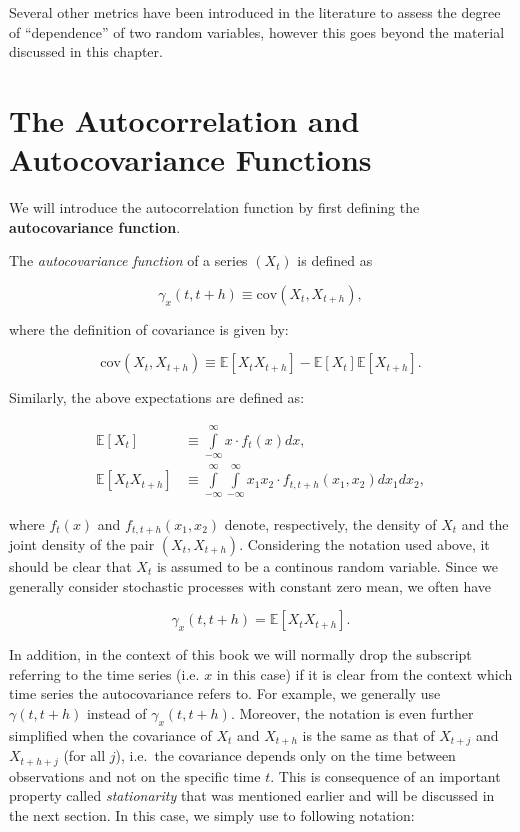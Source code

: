 \documentclass[]{book}
\theoremstyle{definition}
\theoremstyle{definition}
\theoremstyle{definition}
\theoremstyle{remark}
\let\BeginKnitrBlock\begin \let\EndKnitrBlock\end
\begin{document}
Several other metrics have been introduced in the literature to assess
the degree of ``dependence'' of two random variables, however this goes
beyond the material discussed in this chapter.

\hypertarget{the-autocorrelation-and-autocovariance-functions}{%
\section{The Autocorrelation and Autocovariance
Functions}\label{the-autocorrelation-and-autocovariance-functions}}

We will introduce the autocorrelation function by first defining the
\textbf{autocovariance function}.

\BeginKnitrBlock{definition}
\protect\hypertarget{def:acvf}{}{\label{def:acvf} }The \emph{autocovariance
function} of a series \((X_t)\) is defined as

\[{\gamma_x}\left( {t,t+h} \right) \equiv \text{cov} \left( {{X_t},{X_{t+h}}} \right),\]
\EndKnitrBlock{definition}

where the definition of covariance is given by:

\[
    \text{cov} \left( {{X_t},{X_{t+h}}} \right) \equiv \mathbb{E}\left[ {{X_t}{X_{t+h}}} \right] - \mathbb{E}\left[ {{X_t}} \right]\mathbb{E}\left[ {{X_{t+h}}} \right].
    \]

Similarly, the above expectations are defined as:

\[\begin{aligned}
     \mathbb{E}\left[ {{X_t}} \right] &\equiv \int\limits_{ - \infty }^\infty  {x \cdot {f_t}\left( x \right)dx},  \\
     \mathbb{E}\left[ {{X_t}{X_{t+h}}} \right] &\equiv \int\limits_{ - \infty }^\infty  {\int\limits_{ - \infty }^\infty  {{x_1}{x_2} \cdot f_{t,t+h}\left( {{x_1},{x_2}} \right)d{x_1}d{x_2}} } ,
     \end{aligned} \]

where \({f_t}\left( x \right)\) and
\(f_{t,t+h}\left( {{x_1},{x_2}} \right)\) denote, respectively, the
density of \(X_t\) and the joint density of the pair \((X_t, X_{t+h})\).
Considering the notation used above, it should be clear that \(X_t\) is
assumed to be a continous random variable. Since we generally consider
stochastic processes with constant zero mean, we often have

\[{\gamma_x}\left( {t,t+h} \right) = \mathbb{E}\left[X_t X_{t+h} \right]. \]

In addition, in the context of this book we will normally drop the
subscript referring to the time series (i.e. \(x\) in this case) if it
is clear from the context which time series the autocovariance refers
to. For example, we generally use \({\gamma}\left( {t,t+h} \right)\)
instead of \({\gamma_x}\left( {t,t+h} \right)\). Moreover, the notation
is even further simplified when the covariance of \(X_t\) and
\(X_{t+h}\) is the same as that of \(X_{t+j}\) and \(X_{t+h+j}\) (for
all \(j\)), i.e.~the covariance depends only on the time between
observations and not on the specific time \(t\). This is consequence of
an important property called \emph{stationarity} that was mentioned
earlier and will be discussed in the next section. In this case, we
simply use to following notation:
\end{document}
